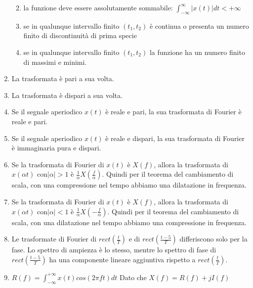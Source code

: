 \documentclass[12pt
]{article}
\providecommand{\tightlist}{%
  \setlength{\itemsep}{0pt}\setlength{\parskip}{0pt}}
\begin{document}
\begin{enumerate}
	\begin{enumerate}
		\def\labelenumii{(\alph{enumii})}
		\tightlist
		\item
		la funzione deve essere assolutamente sommabile: $\displaystyle \int_{-\infty}^{\infty} |x(t)| dt < +\infty$
		\item
		se in qualunque intervallo finito $(t_1, t_2)$ è continua o presenta un numero finito di discontinuità di prima specie
		\item
		 se in qualunque intervallo finito $(t_1, t_2)$ la funzione ha	 un numero finito di massimi e minimi.
	\end{enumerate}
	\item
	La trasformata è pari a sua volta.
	\item
	La trasformata è dispari a sua volta.
	\item
	Se il segnale aperiodico \(x(t)\) è reale e pari, la sua trasformata
	di Fourier è reale e pari.
	\item
	Se il segnale aperiodico \(x(t)\) è reale e dispari, la sua
	trasformata di Fourier è immaginaria pura e dispari.
	\item
Se la trasformata di Fourier di $x(t)$ è $X(f)$, allora la trasformata di $x(\alpha t)$ con$ |\alpha| > 1$ è $\displaystyle \frac{1}{\alpha} X(\frac{f}{\alpha})$. Quindi per il teorema del cambiamento di scala, con una compressione nel tempo abbiamo una dilatazione in frequenza.
	\item
Se la trasformata di Fourier di $x(t)$ è $X(f)$, allora la trasformata di $x(\alpha t)$ con$ |\alpha| < 1$ è $\displaystyle \frac{1}{\alpha} X(-\frac{f}{\alpha})$. Quindi per il teorema del cambiamento di scala, con una dilatazione nel tempo abbiamo una compressione in frequenza.
	\item
	Le trasformate di Fourier di \(rect (\frac{t}{T})\) e di
	\(rect (\frac{t-5}{T})\) differiscono solo per la fase. Lo spettro di
	ampiezza è lo stesso, mentre lo spettro di fase di
	\(rect (\frac{t-5}{T})\) ha una componente lineare aggiuntiva rispetto
	a \(rect (\frac{t}{T})\).
	\item
	$\displaystyle R(f) = \int_{- \infty}^{+\infty} x(t) cos(2\pi ft)dt$
	\newline
	Dato che $\displaystyle X(f) = R(f)+ jI(f)$


\end{enumerate}
\end{document}
